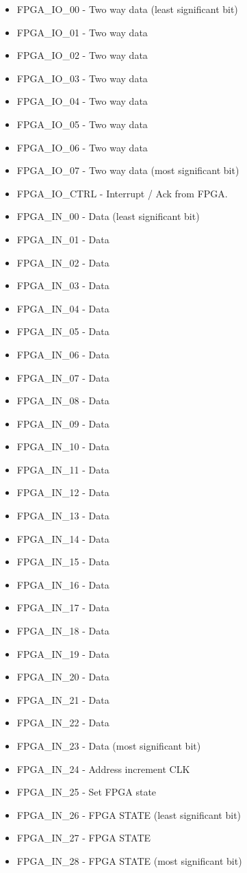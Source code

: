 \begin{itemize}
\item FPGA\_IO\_00 - Two way data (least significant bit)
\item FPGA\_IO\_01 - Two way data
\item FPGA\_IO\_02 - Two way data
\item FPGA\_IO\_03 - Two way data
\item FPGA\_IO\_04 - Two way data
\item FPGA\_IO\_05 - Two way data
\item FPGA\_IO\_06 - Two way data
\item FPGA\_IO\_07 - Two way data (most significant bit)
\item FPGA\_IO\_CTRL - Interrupt / Ack from FPGA.
\item FPGA\_IN\_00 - Data (least significant bit)
\item FPGA\_IN\_01 - Data
\item FPGA\_IN\_02 - Data
\item FPGA\_IN\_03 - Data
\item FPGA\_IN\_04 - Data
\item FPGA\_IN\_05 - Data
\item FPGA\_IN\_06 - Data
\item FPGA\_IN\_07 - Data
\item FPGA\_IN\_08 - Data
\item FPGA\_IN\_09 - Data
\item FPGA\_IN\_10 - Data
\item FPGA\_IN\_11 - Data
\item FPGA\_IN\_12 - Data
\item FPGA\_IN\_13 - Data
\item FPGA\_IN\_14 - Data
\item FPGA\_IN\_15 - Data
\item FPGA\_IN\_16 - Data
\item FPGA\_IN\_17 - Data
\item FPGA\_IN\_18 - Data
\item FPGA\_IN\_19 - Data
\item FPGA\_IN\_20 - Data
\item FPGA\_IN\_21 - Data
\item FPGA\_IN\_22 - Data
\item FPGA\_IN\_23 - Data (most significant bit)
\item FPGA\_IN\_24 - Address increment CLK
\item FPGA\_IN\_25 - Set FPGA state
\item FPGA\_IN\_26 - FPGA STATE (least significant bit)
\item FPGA\_IN\_27 - FPGA STATE
\item FPGA\_IN\_28 - FPGA STATE (most significant bit)
\end{itemize}
